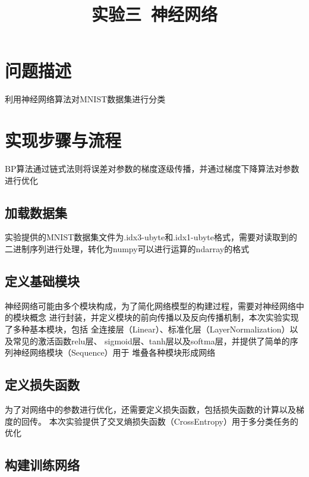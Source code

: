 \documentclass[notitlepage]{article}
\title{实验三\ 神经网络}
\author{}
\date{}
\begin{document}
\maketitle

\vspace{-7em}

\section{问题描述}

利用神经网络算法对MNIST数据集进行分类

\section{实现步骤与流程}

BP算法通过链式法则将误差对参数的梯度逐级传播，并通过梯度下降算法对参数进行优化

\subsection*{加载数据集}

实验提供的MNIST数据集文件为.idx3-ubyte和.idx1-ubyte格式，需要对读取到的
二进制序列进行处理，转化为numpy可以进行运算的ndarray的格式

\subsection*{定义基础模块}

神经网络可能由多个模块构成，为了简化网络模型的构建过程，需要对神经网络中的模块概念
进行封装，并定义模块的前向传播以及反向传播机制，本次实验实现了多种基本模块，包括
全连接层（Linear）、标准化层（LayerNormalization）以及常见的激活函数relu层、
sigmoid层、tanh层以及softma层，并提供了简单的序列神经网络模块（Sequence）用于
堆叠各种模块形成网络

\subsection*{定义损失函数}

为了对网络中的参数进行优化，还需要定义损失函数，包括损失函数的计算以及梯度的回传。
本次实验提供了交叉熵损失函数（CrossEntropy）用于多分类任务的优化

\subsection*{构建训练网络}
\end{document}
